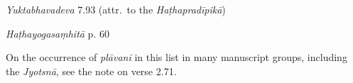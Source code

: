 \begin{ekdosis}
\begin{testimonia}[hp02_044]
\begin{versinnote}
\end{versinnote}

\emph{Yuktabhavadeva} 7.93 (attr.~to the \emph{Haṭhapradīpikā})
\begin{versinnote}
\end{versinnote}

\emph{Haṭhayogasaṃhitā} p. 60
\begin{versinnote}
\end{versinnote}
\end{testimonia}

\begin{philcomm}[hp02_044]
On the occurrence of \emph{plāvanī} in this list in many manuscript groups, including the \textit{Jyotsnā}, see the note on verse 2.71.
%
\end{philcomm}


\end{ekdosis}
